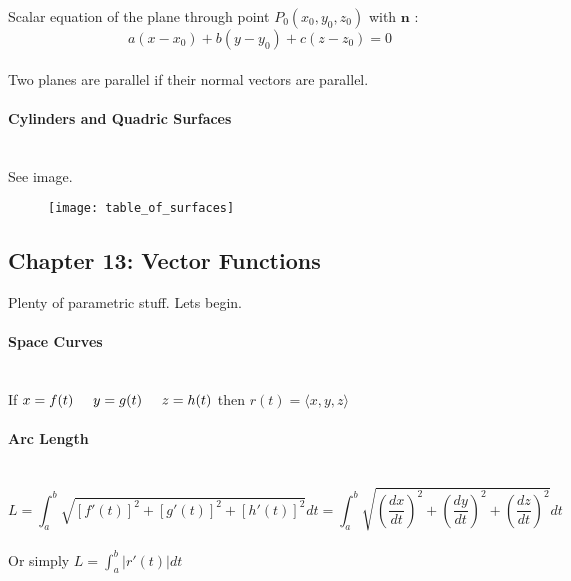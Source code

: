 \documentclass{article}
\begin{document}
Scalar equation of the plane through point \(P_0(x_0, y_0, z_0)\) with \(\mathbf{n}\) :\\
\begin{equation}
    a(x-x_0) + b(y-y_0) + c(z-z_0) = 0
\end{equation}\\

Two planes are parallel if their normal vectors are parallel.\\

\paragraph{Cylinders and Quadric Surfaces}\mbox{}\\
See image.\\
\begin{figure}[t]
    \centering
    \texttt{[image: table\_of\_surfaces]}
\end{figure}

\subsection*{Chapter 13: Vector Functions}
Plenty of parametric stuff. Lets begin.\\

\paragraph{Space Curves}\mbox{}\\
If \(x = f(t)\hspace{0.5cm}y = g(t)\hspace{0.5cm}z = h(t)\)\hspace{0.5cm} then \hspace{0.5cm}\(r(t) = \langle x,y,z \rangle\)\\

\paragraph{Arc Length}\mbox{}\\
\begin{equation}
    L = \int_{a}^{b} \sqrt{[f'(t)]^2 + [g'(t)]^2 + [h'(t)]^2} dt =
    \int_{a}^{b} \sqrt{\left(\frac{dx}{dt}\right)^2 + \left(\frac{dy}{dt}\right)^2 + \left(\frac{dz}{dt}\right)^2} dt
\end{equation}\\

Or simply  \(L = \int_{a}^{b} |r'(t)| dt\)\\
\end{document}
